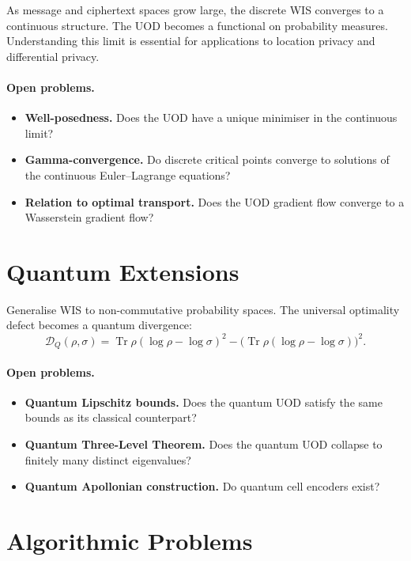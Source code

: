 As message and ciphertext spaces grow large, the discrete WIS
converges to a continuous structure.  The UOD becomes a functional on
probability measures.  Understanding this limit is essential for
applications to location privacy and differential privacy.

\paragraph{Open problems.}
\begin{itemize}
\item \textbf{Well-posedness.}  Does the UOD have a unique minimiser
in the continuous limit?
\item \textbf{Gamma-convergence.}  Do discrete critical points converge
to solutions of the continuous Euler--Lagrange equations?
\item \textbf{Relation to optimal transport.}  Does the UOD gradient
flow converge to a Wasserstein gradient flow?
\end{itemize}

\section{Quantum Extensions}\label{ch:sec:open-quantum}

Generalise WIS to non-commutative probability spaces.  The universal
optimality defect becomes a quantum divergence:
\[
\mathcal D_Q(\rho,\sigma) = \operatorname{Tr}\rho(\log\rho-\log\sigma)^2
- \bigl(\operatorname{Tr}\rho(\log\rho-\log\sigma)\bigr)^2.
\]

\paragraph{Open problems.}
\begin{itemize}
\item \textbf{Quantum Lipschitz bounds.}  Does the quantum UOD satisfy
the same bounds as its classical counterpart?
\item \textbf{Quantum Three-Level Theorem.}  Does the quantum UOD
collapse to finitely many distinct eigenvalues?
\item \textbf{Quantum Apollonian construction.}  Do quantum cell
encoders exist?
\end{itemize}

\section*{Algorithmic Problems}

